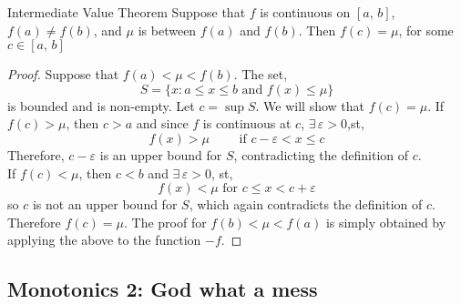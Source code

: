 \documentclass{article}
\newcommand{\e}{\varepsilon}
\newcommand{\ex}{\exists\,}
\begin{document}
\begin{figure}[H]
  \centering
\end{figure}
\begin{theorem}{Intermediate Value Theorem}{}
  Suppose that $f$ is continuous on $[a,\, b]$, $f(a)\neq f(b)$, and $\mu$ is between $f(a)$ and $f(b)$. Then $f(c) = \mu$, for some $c\in [a,\, b]$
\end{theorem}
\begin{proof}
  Suppose that $f(a) < \mu < f(b)$. The set,
  $$ S = \{ x : a \le x \le b \text{ and }f(x)\le\mu  \} $$
  is bounded and is non-empty. Let $c = \sup S$. We will show that $f(c) = \mu$. If $f(c) > \mu$, then $c > a$ and since $f$ is continuous at $c$, $\ex\e>0$,st,
  $$ f(x) > \mu \qquad\text{ if }c - \e < x \le c $$
  Therefore, $c - \e$ is an upper bound for $S$, contradicting the definition of $c$.\\
  If $f(c) < \mu$, then $c < b$ and $\ex\e>0$, st,
  $$ f(x) < \mu \text{ for } c \le x < c + \e $$
  so $c$ is not an upper bound for $S$, which again contradicts the definition of $c$. \\
  Therefore $f(c) = \mu$. The proof for $f(b) < \mu < f(a)$ is simply obtained by applying the above to the function $-f$.
\end{proof}

\subsection{Monotonics 2: God what a mess}
\end{document}
